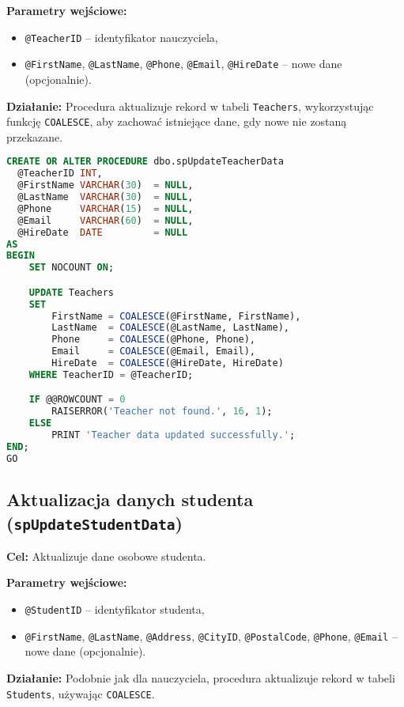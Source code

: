 \documentclass[12pt]{article}
\begin{document}
\textbf{Parametry wejściowe:}
\begin{itemize}
  \item \verb|@TeacherID| – identyfikator nauczyciela,
  \item \verb|@FirstName|, \verb|@LastName|, \verb|@Phone|, \verb|@Email|, \verb|@HireDate| – nowe dane (opcjonalnie).
\end{itemize}

\textbf{Działanie:} Procedura aktualizuje rekord w tabeli \verb|Teachers|, wykorzystując funkcję \verb|COALESCE|, aby zachować istniejące dane, gdy nowe nie zostaną przekazane.

\begin{lstlisting}[language=SQL]
CREATE OR ALTER PROCEDURE dbo.spUpdateTeacherData
  @TeacherID INT,
  @FirstName VARCHAR(30)  = NULL,
  @LastName  VARCHAR(30)  = NULL,
  @Phone     VARCHAR(15)  = NULL,
  @Email     VARCHAR(60)  = NULL,
  @HireDate  DATE         = NULL
AS
BEGIN
    SET NOCOUNT ON;

    UPDATE Teachers
    SET
        FirstName = COALESCE(@FirstName, FirstName),
        LastName  = COALESCE(@LastName, LastName),
        Phone     = COALESCE(@Phone, Phone),
        Email     = COALESCE(@Email, Email),
        HireDate  = COALESCE(@HireDate, HireDate)
    WHERE TeacherID = @TeacherID;

    IF @@ROWCOUNT = 0
        RAISERROR('Teacher not found.', 16, 1);
    ELSE
        PRINT 'Teacher data updated successfully.';
END;
GO
\end{lstlisting}

\newpage
\subsection{Aktualizacja danych studenta (\texttt{spUpdateStudentData})}
\textbf{Cel:} Aktualizuje dane osobowe studenta.

\textbf{Parametry wejściowe:}
\begin{itemize}
  \item \verb|@StudentID| – identyfikator studenta,
  \item \verb|@FirstName|, \verb|@LastName|, \verb|@Address|, \verb|@CityID|, \verb|@PostalCode|, \verb|@Phone|, \verb|@Email| – nowe dane (opcjonalnie).
\end{itemize}

\textbf{Działanie:} Podobnie jak dla nauczyciela, procedura aktualizuje rekord w tabeli \verb|Students|, używając \verb|COALESCE|.
\end{document}
